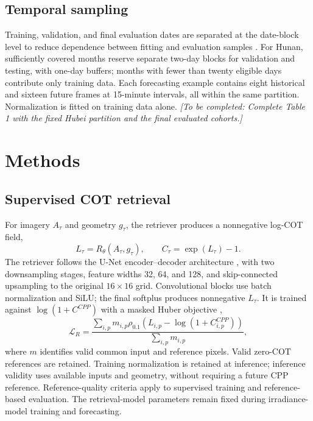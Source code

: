 \documentclass[11pt]{article}
\newcommand{\pending}[1]{\textit{[To be completed: #1]}}
\begin{document}
\subsection{Temporal sampling}
Training, validation, and final evaluation dates are separated at the date-block level to reduce dependence between fitting and evaluation samples \cite{roberts2017}. For Hunan, sufficiently covered months reserve separate two-day blocks for validation and testing, with one-day buffers; months with fewer than twenty eligible days contribute only training data. Each forecasting example contains eight historical and sixteen future frames at 15-minute intervals, all within the same partition. Normalization is fitted on training data alone. \pending{Complete Table 1 with the fixed Hubei partition and the final evaluated cohorts.}

\section{Methods}
\subsection{Supervised COT retrieval}
For imagery $A_\tau$ and geometry $g_\tau$, the retriever produces a nonnegative log-COT field,
\begin{equation}
L_\tau=R_\theta(A_\tau,g_\tau),\qquad C_\tau=\exp(L_\tau)-1.
\label{eq:retrieval}
\end{equation}
The retriever follows the U-Net encoder--decoder architecture \cite{unet2015}, with two downsampling stages, feature widths 32, 64, and 128, and skip-connected upsampling to the original $16\times16$ grid. Convolutional blocks use batch normalization and SiLU; the final softplus produces nonnegative $L_\tau$. It is trained against $\log(1+C^{CPP})$ with a masked Huber objective \cite{huber1964},
\begin{equation}
\mathcal L_R=\frac{\sum_{i,p}m_{i,p}\rho_{0.1}\!\left(L_{i,p}-\log(1+C^{CPP}_{i,p})\right)}{\sum_{i,p}m_{i,p}},
\label{eq:retrieval-loss}
\end{equation}
where $m$ identifies valid common input and reference pixels. Valid zero-COT references are retained. Training normalization is retained at inference; inference validity uses available inputs and geometry, without requiring a future CPP reference. Reference-quality criteria apply to supervised training and reference-based evaluation. The retrieval-model parameters remain fixed during irradiance-model training and forecasting.
\end{document}
